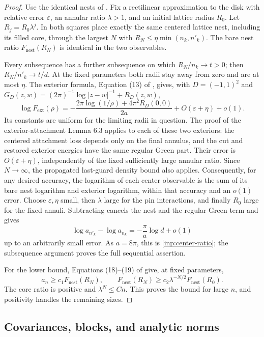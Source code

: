 \begin{proof}
Use the identical nests of \cite[Section 6.2]{S}.  Fix a rectilinear
approximation to the disk with relative error \(\varepsilon\), an
annular ratio \(\lambda>1\), and an initial lattice radius \(R_0\).
Let \(R_j=R_0\lambda^j\).  In both squares place exactly the same
centered lattice nest, including its filled core, through the largest
\(N\) with \(R_N\le\eta\min(n_k,n'_k)\).
The bare nest ratio \(F_{\mathrm{nest}}(R_N)\) is identical in the
two observables.

Every subsequence has a further subsequence on which
\(R_N/n_k\to t>0\); then \(R_N/n'_k\to t/d\).
At the fixed parameters both radii stay away from zero and are at
most \(\eta\).  The exterior formula, Equation (13) of \cite{S}, gives, with
\(D=(-1,1)^2\) and
\(G_D(z,w)=(2\pi)^{-1}\log|z-w|^{-1}+R_D(z,w)\),
\[
 \log F_{\mathrm{ext}}(\rho)
 =-\frac{2\pi\log(1/\rho)+4\pi^2R_D(0,0)}{2a}
       +O(\varepsilon+\eta)+o(1).
\]
Its constants are uniform for the limiting radii in question.
The proof of the exterior-attachment Lemma
6.3 applies to each of these two
exteriors: the centered attachment loss depends only on the final
annulus, and the cut and restored exterior energies have the same
regular Green part.  Their error is \(O(\varepsilon+\eta)\),
independently of the fixed sufficiently large annular ratio.
Since \(N\to\infty\), the propagated last-guard density bound also
applies.  Consequently, for any desired accuracy, the logarithm of
each center observable is the sum of its bare nest logarithm and
exterior logarithm, within that accuracy and an \(o(1)\) error.
Choose \(\varepsilon,\eta\) small, then \(\lambda\) large for
the pin interactions, and finally \(R_0\) large for the fixed annuli.
Subtracting cancels the nest and the regular Green term and gives
\[
 \log a_{n'_k}-\log a_{n_k}
             =-\frac\pi a\log d+o(1)
\]
up to an arbitrarily small error.  As \(a=8\pi\), this is
\eqref{inp:center-ratio}; the subsequence argument proves the full
sequential assertion.

For the lower bound, Equations (18)--(19) of \cite{S} give, at fixed
parameters,
\[
 a_n\ge c_1F_{\mathrm{nest}}(R_N),\qquad
 F_{\mathrm{nest}}(R_N)\ge c_2\lambda^{-N/2}
                                  F_{\mathrm{nest}}(R_0).
\]
The core ratio is positive and \(\lambda^N\le Cn\).  This proves
the bound for large \(n\), and positivity handles the remaining sizes.
\end{proof}

\subsection{Covariances, blocks, and analytic norms}

